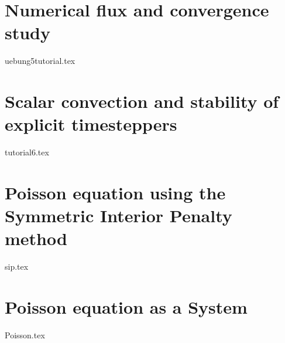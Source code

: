 \documentclass[a4paper,10pt]{report} %
\begin{document}
\chapter{Numerical flux and convergence study}
\label{NumFlux}
{uebung5tutorial.tex}


\chapter{Scalar convection and stability of explicit timesteppers}
\label{ScalarAdvection}
{tutorial6.tex}





\chapter{Poisson equation using the Symmetric Interior Penalty method}
\label{sec:SIP}
{sip.tex}

\chapter{Poisson equation as a System}
\label{sec:PoissonAsASystem}
{Poisson.tex}
\end{document}
